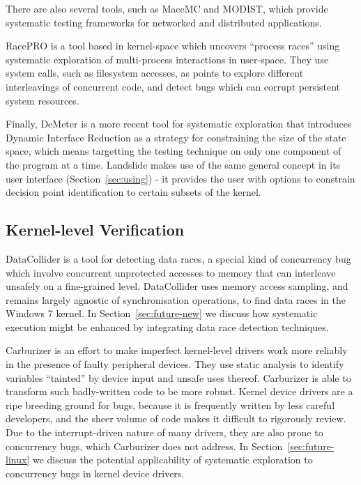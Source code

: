 There are also several tools, such as MaceMC\cite{macemc} and MODIST\cite{modist}, which provide systematic testing frameworks for networked and distributed applications.

RacePRO\cite{racepro} is a tool based in kernel-space which uncovers ``process races'' using systematic exploration of multi-process interactions in user-space. They use system calls, such as filesystem accesses, as points to explore different interleavings of concurrent code, and detect bugs which can corrupt persistent system resources.

Finally, DeMeter\cite{demeter} is a more recent tool for systematic exploration that introduces Dynamic Interface Reduction as a strategy for constraining the size of the state space, which means targetting the testing technique on only one component of the program at a time. Landslide makes use of the same general concept in its user interface (Section~\ref{sec:using}) - it provides the user with options to constrain decision point identification to certain subsets of the kernel.

\subsection{Kernel-level Verification}

DataCollider\cite{datacollider} is a tool for detecting data races, a special kind of concurrency bug which involve concurrent unprotected accesses to memory that can interleave unsafely on a fine-grained level.
DataCollider uses memory access sampling, and remains largely agnostic of synchronisation operations, to find data races in the Windows 7 kernel.
In Section~\ref{sec:future-new} we discuss how systematic execution might be enhanced by integrating data race detection techniques.

Carburizer\cite{carburizer} is an effort to make imperfect kernel-level drivers work more reliably in the presence of faulty peripheral devices. They use static analysis to identify variables ``tainted'' by device input and unsafe uses thereof. Carburizer is able to transform such badly-written code to be more robust.
Kernel device drivers are a ripe breeding ground for bugs, because it is frequently written by less careful developers, and the sheer volume of code makes it difficult to rigorously review.
Due to the interrupt-driven nature of many drivers, they are also prone to concurrency bugs, which Carburizer does not address.
In Section~\ref{sec:future-linux} we discuss the potential applicability of systematic exploration to concurrency bugs in kernel device drivers.

